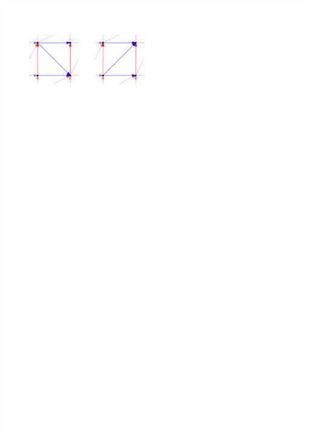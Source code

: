 \documentclass[a4paper]{article}
\begin{document}
\includegraphics[scale=1]{./unifiedAlgo/img/zflip/blueZ.pdf}
\clearpage%
\end{document}
